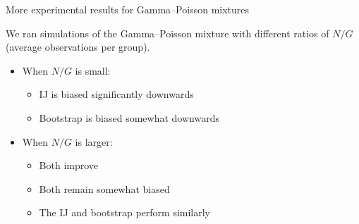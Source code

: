 \begin{frame}{More experimental results for Gamma--Poisson mixtures}
    \begin{minipage}[c]{0.35\textwidth}
        We ran simulations of the Gamma--Poisson mixture with
        different ratios of $N / G$ \\(average observations per group).

        \spskip
        \begin{itemize}
            \item When $N/G$ is small:
            \begin{itemize}
                \item IJ is biased significantly downwards
                \item Bootstrap is biased somewhat downwards
            \end{itemize}
            \item When $N/G$ is larger:
            \begin{itemize}
                \item Both improve
                \item Both remain somewhat biased
                \item The IJ and bootstrap perform similarly
            \end{itemize}
        \end{itemize}
    \end{minipage}
    \begin{minipage}[c]{0.6\textwidth}
    \PoissonREGraph{}
    \end{minipage}
\end{frame}
